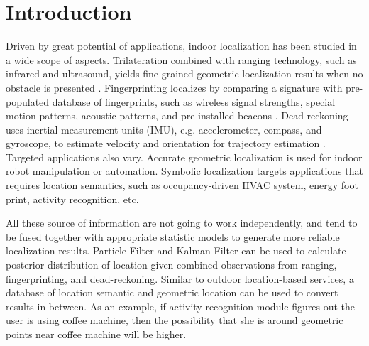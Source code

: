 \section{Introduction}
\label{sec:intro}


Driven by great potential of applications, indoor localization has been studied in a wide scope of aspects.
Trilateration combined with ranging technology, such as infrared and ultrasound,
yields fine grained geometric localization results when no obstacle is presented . 
Fingerprinting localizes by comparing a signature with pre-populated database of fingerprints, such as 
wireless signal strengths, special motion patterns, acoustic patterns, and pre-installed beacons . 
Dead reckoning uses inertial measurement units (IMU), e.g. accelerometer, compass, and gyroscope, to estimate 
velocity and orientation for trajectory estimation . Targeted applications also vary. Accurate geometric 
localization is used for indoor robot manipulation or automation. Symbolic localization targets applications that requires 
location semantics, such as occupancy-driven HVAC system, energy foot print, activity recognition, etc. 



All these source of information are not going to work independently, and tend to be fused together with 
appropriate statistic models to generate more reliable localization results. 
Particle Filter and Kalman Filter can be used to calculate posterior distribution of location given 
combined observations from ranging, fingerprinting, and dead-reckoning. Similar to outdoor location-based services, 
a database of location semantic 
and geometric location  can be used to convert results in between.
As an example, if activity recognition module figures out the user is using coffee machine, then the possibility 
that she is around geometric points near coffee machine will be higher. 







